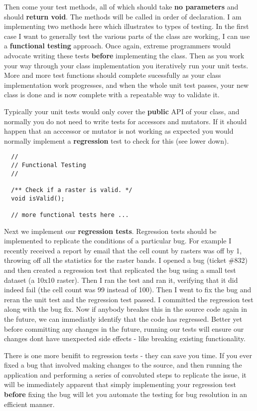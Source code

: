 Then come your test methods, all of which should take \textbf{no parameters} and
should \textbf{return void}. The methods will be called in order of declaration.  I
am implementing two methods here which illustrates to types of testing. In the
first case I want to generally test the various parts of the class are working,
I can use a \textbf{functional testing} approach. Once again, extreme programmers
would advocate writing these tests \textbf{before} implementing the class. Then as
you work your way through your class implementation you iteratively run your
unit tests. More and more test functions should complete sucessfully as your
class implementation work progresses, and when the whole unit test passes, your
new class is done and is now complete with a repeatable way to validate it.

Typically your unit tests would only cover the \textbf{public} API of your class,
and normally you do not need to write tests for accessors and mutators.  If it
should happen that an acccessor or mutator is not working as expected you would
normally implement a \textbf{regression} test to check for this (see lower down).

\begin{verbatim}
  //
  // Functional Testing
  //
  
  /** Check if a raster is valid. */
  void isValid();

  // more functional tests here ...
\end{verbatim}

Next we implement our \textbf{regression tests}. Regression tests should be
implemented to replicate the conditions of a particular bug. For example I
recently received a report by email that the cell count by rasters was off by
1, throwing off all the statistics for the raster bands. I opened a bug (ticket
\#832) and then created a regression test that replicated the bug using a small
test dataset (a 10x10 raster). Then I ran the test and ran it, verifying that
it did indeed fail (the cell count was 99 instead of 100). Then I went to fix
the bug and reran the unit test and the regression test passed. I committed the
regression test along with the bug fix. Now if anybody breakes this in the
source code again in the future, we can immediatly identify that the code has
regressed. Better yet before committing any changes in the future, running our
tests will ensure our changes dont have unexpected side effects - like breaking
existing functionality.

There is one more benifit to regression tests - they can save you time.  If you
ever fixed a bug that involved making changes to the source, and then running
the application and performing a series of convoluted steps to replicate the
issue, it will be immediately apparent that simply implementing your regression
test \textbf{before} fixing the bug will let you automate the testing for bug
resolution in an efficient manner.

